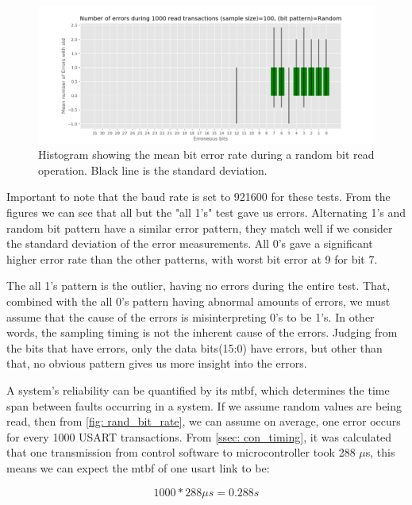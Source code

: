 \documentclass[main.tex]{subfiles}
\begin{document}
\begin{figure}[!ht]
    \centering
    \includegraphics[width=18cm]{images/error_rate_random.png}
    \caption{Histogram showing the mean bit error rate during a random bit read operation. Black line is the standard deviation.}
    \label{fig: rand_bit_rate}
\end{figure}
\FloatBarrier

Important to note that the baud rate is set to 921600 for these tests. From the figures we can see that all but the "all 1's" test gave us errors. Alternating 1's and random bit pattern have a similar error pattern, they match well if we consider the standard deviation of the error measurements. All 0's gave a significant higher error rate than the other patterns, with worst bit error at 9 for bit 7.



The all 1's pattern is the outlier, having no errors during the entire test. That, combined with the all 0's pattern having abnormal amounts of errors, we must assume that the cause of the errors is misinterpreting 0's to be 1's. In other words, the sampling timing is not the inherent cause of the errors. Judging from the bits that have errors, only the data bits(15:0) have errors, but other than that, no obvious pattern gives us more insight into the errors.

A system's reliability can be quantified by its \gls{mtbf}, which determines the time span between faults occurring in a system\cite{mtbf_intro}. If we assume random values are being read, then from \autoref{fig: rand_bit_rate}, we can assume on average, one error occurs for every 1000 USART transactions. From \autoref{ssec: con_timing}, it was calculated that one transmission from control software to microcontroller took 288 $\mu$s, this means we can expect the \gls{mtbf} of one \gls{usart} link to be:

\begin{equation} \label{eqn:single_mtbf}
1000*288\mu s = 0.288 s
\end{equation}
\end{document}
